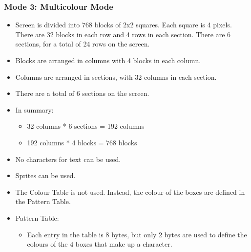         \subsubsection{Mode 3: \textbf{Multicolour Mode}}
        \begin{itemize}
            \item Screen is divided into 768 blocks of 2x2 squares. Each square
                is 4 pixels. There are 32 blocks in each row and 4 rows in each
                section. There are 6 sections, for a total of 24 rows on the
                screen.
            \item Blocks are arranged in columns with 4 blocks in each column.
            \item Columns are arranged in sections, with 32 columns in each
                section.
            \item There are a total of 6 sections on the screen.
            \item In summary:
            \begin{itemize}
                \item 32 columns * 6 sections = 192 columns
                \item 192 columns * 4 blocks = 768 blocks
            \end{itemize}
            \item No characters for text can be used.
            \item Sprites can be used.
            \item The Colour Table is not used. Instead, the colour of the boxes
            are defined in the Pattern Table.
            \item Pattern Table:
            \begin{itemize}
                \item Each entry in the table is 8 bytes, but only 2 bytes are
                        used to define the colours of the 4 boxes that make up
                        a character.
            \end{itemize}
        \end{itemize}

